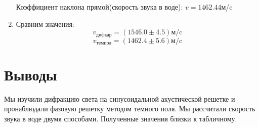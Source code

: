 \documentclass[a4paper,12pt]{article}
\begin{document}
\begin{enumerate}
    Коэффициент наклона прямой(скорость звука в воде): $v=1462.44$м/c

    \item Сравним значения:
    $$
    v_\text{дифкар} = (1546.0\pm4.5) \text{м/c}
    $$
    $$
    v_\text{темпол} = (1462.4\pm5.6)\text{м/c}
    $$
\end{enumerate}

\section{Выводы}
Мы изучили дифракцию света на синусоидальной акустической решетке и пронаблюдали фазовую решетку методом темного поля. Мы рассчитали скорость звука в воде двумя способами. Полученные значения близки к табличному.
\end{document}
